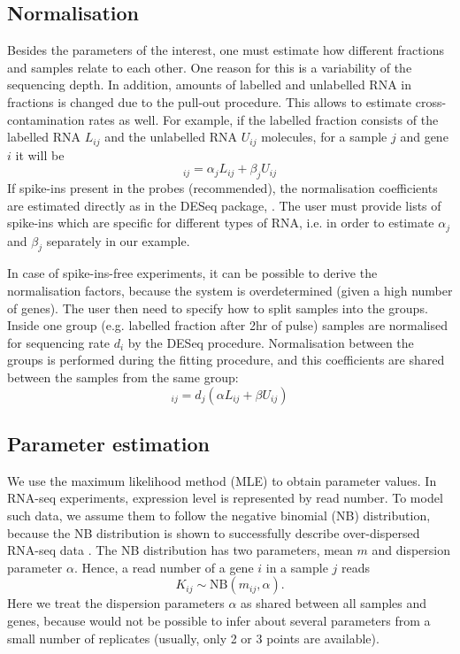 \subsection{Normalisation}
Besides the parameters of the interest, one must estimate how different fractions
and samples relate to each other. One reason for this is a variability of the sequencing
depth. In addition, amounts of labelled and unlabelled RNA in fractions is changed due to 
the pull-out procedure.
This allows to estimate cross-contamination rates as well. For example, 
if the labelled fraction consists of the labelled RNA $L_{ij}$ and the unlabelled RNA
 $U_{ij}$ molecules, for a sample $j$ and gene $i$ it will be
\begin{equation}
 [\text{labelled fraction}]_{ij}  = \alpha_{j} L_{ij} + \beta_{j} U_{ij}
\end{equation}
If spike-ins present in the probes (recommended), the normalisation coefficients 
are estimated directly as in the DESeq package, \citet{anders2010differential}. 
The user must provide lists of spike-ins which are  specific for different types of RNA, 
i.e. in order to estimate $\alpha_j$ and $\beta_j$ separately in our example.
\par
In case of spike-ins-free experiments, 
it can be possible to derive the normalisation factors, 
because the system is overdetermined (given a high number of genes).
The user then need to specify how to split samples into the groups.
Inside one group (e.g. labelled fraction after 2hr of pulse) samples are normalised for sequencing rate $d_i$ by
the DESeq procedure.
Normalisation between the groups is performed during the fitting procedure, 
and this coefficients are shared between the samples from the same group:
\begin{equation}
 [\text{labelled fraction}]_{ij}  = d_j(\alpha L_{ij} + \beta U_{ij})
\end{equation}

\subsection*{Parameter estimation}
We use the maximum likelihood method (MLE) to obtain parameter values.
In RNA-seq experiments, expression level is represented by read number.
To model such data, we assume them to follow the negative binomial (NB) distribution, 
because the NB distribution is  shown to successfully describe over-dispersed RNA-seq data 
\citep{robinson2007moderated}.
The NB distribution has two parameters, mean $m$ and dispersion parameter 
$\alpha$.
Hence,  a read number of a gene $i$ in a sample $j$ reads
\begin{equation}
 K_{ij} \sim \text{NB}(m_{ij}, \alpha).
\end{equation}
Here we treat the  dispersion parameters $\alpha$ as  shared between all
samples and genes, because would not be possible to infer about several parameters
from a small number of replicates (usually, only 2 or 3 points are available).


